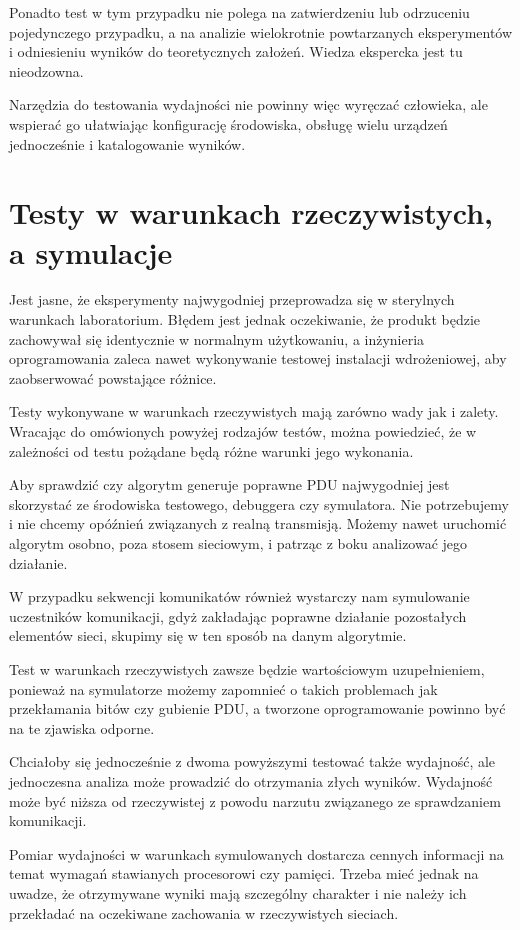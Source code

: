 \documentclass[00-praca-magisterska.tex]{subfiles}
\begin{document}
Ponadto test w tym przypadku nie polega na zatwierdzeniu lub odrzuceniu
pojedynczego przypadku, a na analizie wielokrotnie powtarzanych eksperymentów i
odniesieniu wyników do teoretycznych założeń. Wiedza ekspercka jest tu
nieodzowna.

Narzędzia do testowania wydajności nie powinny więc wyręczać człowieka, ale
wspierać go ułatwiając konfigurację środowiska, obsługę wielu urządzeń
jednocześnie i katalogowanie wyników.

\section{Testy w warunkach rzeczywistych, a symulacje}

Jest jasne, że eksperymenty najwygodniej przeprowadza się w sterylnych
warunkach laboratorium. Błędem jest jednak oczekiwanie, że produkt będzie
zachowywał się identycznie w normalnym użytkowaniu, a inżynieria oprogramowania
zaleca nawet wykonywanie testowej instalacji wdrożeniowej, aby zaobserwować
powstające różnice.

Testy wykonywane w warunkach rzeczywistych mają zarówno wady jak i zalety.
Wracając do omówionych powyżej rodzajów testów, można powiedzieć, że w
zależności od testu pożądane będą różne warunki jego wykonania.

Aby sprawdzić czy algorytm generuje poprawne PDU najwygodniej jest skorzystać
ze środowiska testowego, debuggera czy symulatora. Nie potrzebujemy i nie
chcemy opóźnień związanych z realną transmisją. Możemy nawet uruchomić algorytm
osobno, poza stosem sieciowym, i patrząc z boku analizować jego działanie.

W przypadku sekwencji komunikatów również wystarczy nam symulowanie
uczestników komunikacji, gdyż zakładając poprawne działanie pozostałych
elementów sieci, skupimy się w ten sposób na danym algorytmie.

Test w warunkach rzeczywistych zawsze będzie wartościowym uzupełnieniem,
ponieważ na symulatorze możemy zapomnieć o takich problemach jak przekłamania
bitów czy gubienie PDU, a tworzone oprogramowanie powinno być na te zjawiska odporne.

Chciałoby się jednocześnie z dwoma powyższymi testować także wydajność, ale
jednoczesna analiza może prowadzić do otrzymania złych wyników. Wydajność może
być niższa od rzeczywistej z powodu narzutu związanego ze sprawdzaniem
komunikacji.

Pomiar wydajności w warunkach symulowanych dostarcza cennych informacji na
temat wymagań stawianych procesorowi czy pamięci. Trzeba mieć jednak na uwadze,
że otrzymywane wyniki mają szczególny charakter i nie należy ich przekładać na
oczekiwane zachowania w rzeczywistych sieciach. 
\end{document}
